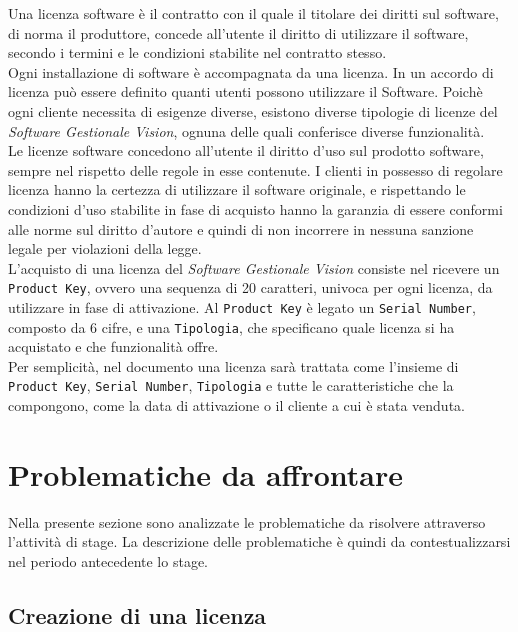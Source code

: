 Una licenza software è il contratto con il quale il titolare dei diritti sul software, di norma il produttore, concede all'utente il diritto di utilizzare il software, secondo i termini e le condizioni stabilite nel contratto stesso.
\\
Ogni installazione di software è accompagnata da una licenza. In un accordo di licenza può essere definito quanti utenti possono utilizzare il Software. Poichè ogni cliente necessita di esigenze diverse, esistono diverse tipologie di licenze del \textit{Software Gestionale Vision}, ognuna delle quali conferisce diverse funzionalità. 
\\
Le licenze software concedono all'utente il diritto d'uso sul prodotto software, sempre nel rispetto delle regole in esse contenute. I clienti in possesso di regolare licenza hanno la certezza di utilizzare il software originale, e rispettando le condizioni d'uso stabilite in fase di acquisto hanno la garanzia di essere conformi alle norme sul diritto d'autore e quindi di non incorrere in nessuna sanzione legale per violazioni della legge.
\\
L'acquisto di una licenza del \textit{Software Gestionale Vision} consiste nel ricevere un \texttt{Product Key}, ovvero una sequenza di 20 caratteri, univoca per ogni licenza, da utilizzare in fase di attivazione. Al \texttt{Product Key} è legato un \texttt{Serial Number}, composto da 6 cifre, e una \texttt{Tipologia}, che specificano quale licenza si ha acquistato e che funzionalità offre.
\\
Per semplicità, nel documento una licenza sarà trattata come l'insieme di \texttt{Product Key}, \texttt{Serial Number}, \texttt{Tipologia} e tutte le caratteristiche che la compongono, come la data di attivazione o il cliente a cui è stata venduta.

\newpage
\section{Problematiche da affrontare}
Nella presente sezione sono analizzate le problematiche da risolvere attraverso l'attività di stage. La descrizione delle problematiche è quindi da contestualizzarsi nel periodo antecedente lo stage.

\subsection{Creazione di una licenza}

